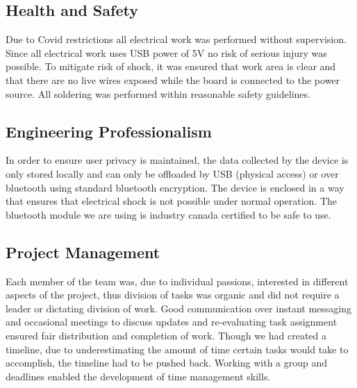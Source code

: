 \subsection{Health and Safety}
Due to Covid restrictions all electrical work was performed without supervision.  
Since all electrical work uses USB power of 5V no risk of serious injury was possible.
To mitigate risk of shock, it was ensured that work area is clear and that there are no live wires exposed while the board is connected to the power source.
All soldering was performed within reasonable safety guidelines.

\subsection{Engineering Professionalism}
In order to ensure user privacy is maintained, the data collected by the device is only stored locally and
can only be offloaded by USB (physical access) or over bluetooth using standard bluetooth encryption.
The device is enclosed in a way that ensures that electrical shock is not possible under normal operation.
The bluetooth module we are using is industry canada certified to be safe to use.

\subsection{Project Management}
Each member of the team was, due to individual passions, interested in different
aspects of the project, thus division of tasks was organic and did not require a leader or dictating division of work.
Good communication over instant messaging and occasional meetings to discuss updates and re-evaluating
task assignment ensured fair distribution and completion of work.
Though we had created a timeline,
due to underestimating the amount of time certain tasks would take to
accomplish, the timeline had to be pushed back. Working with a group and
deadlines enabled the development of time management skills.


